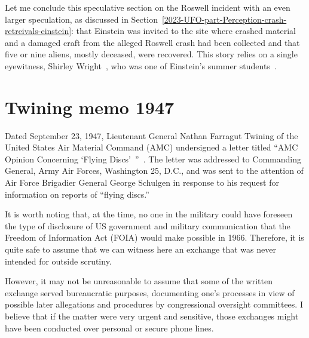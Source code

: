Let me conclude this speculative section on the Roswell incident with an even larger speculation, as discussed in Section~\ref{2023-UFO-part-Perception-crash-retreivals-einstein}: that Einstein was invited to the site where crashed material and a damaged craft from the alleged Roswell crash had been collected and that five or nine aliens, mostly deceased, were recovered. This story relies on a single eyewitness, Shirley Wright~\cite{ShirleyWrightObituaryLegacy2015Jul}, who was one of Einstein's summer students~\cite{BragaliaEinstein}.


\section{Twining memo 1947}

\label{2023-UFO-part-History-chapter-post-1945-pre-1953.tex-tm1947}



Dated September 23, 1947, Lieutenant General Nathan Farragut Twining of the United States Air Material Command (AMC) undersigned a letter titled ``AMC Opinion Concerning `Flying Discs'~''~\cite{Zabel2022Mar}. The letter was addressed to Commanding General, Army Air Forces, Washington 25, D.C., and was sent to the attention of Air Force Brigadier General George Schulgen in response to his request for information on reports of ``flying discs.''

It is worth noting that, at the time, no one in the military could have foreseen the type of disclosure of US government and military communication that the Freedom of Information Act (FOIA) would make possible in 1966. Therefore, it is quite safe to assume that we can witness here an exchange that was never intended for outside scrutiny.

However, it may not be unreasonable to assume that some of the written exchange served bureaucratic purposes, documenting one's processes in view of possible later allegations and procedures by congressional oversight committees. I believe that if the matter were very urgent and sensitive, those exchanges might have been conducted over personal or secure phone lines.

